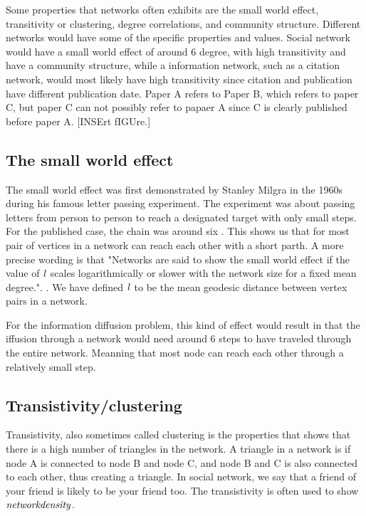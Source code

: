 Some properties that networks often exhibits are the small world effect, transitivity or clustering, degree correlations, and community structure\cite{ComplexNetwork2003}. Different networks would have some of the specific properties and values. Social network would have a small world effect of around 6 degree, with high transitivity and have a community structure, while a information network, such as a citation network, would most likely have high transitivity since citation and publication have different publication date. Paper A refers to Paper B, which refers to paper C, but paper C can not possibly refer to papaer A since C is clearly published before paper A. [INSErt fIGUre.]

\subsection{The small world effect}
The small world effect was first demonstrated by Stanley Milgra in the 1960s during his famous letter passing experiment\cite{SmallWorldProblemSmilgram1960}. The experiment was about passing letters from person to person to reach a designated target with only small steps. For the published case, the chain was around six \cite{Experiment1969}. This shows us that for most pair of vertices in a network can reach each other with a short parth. A more precise wording is that "Networks are said to show the small world effect if the value of $\it{l}$ scales logarithmically or slower with the network size for a fixed mean degree.". \cite{ComplexNetwork2003}. We have defined $\it{l} $ to be the mean geodesic distance between vertex pairs in a network.

For the information diffusion problem, this kind of effect would result in that the  iffusion through a network would need around 6 steps to have traveled through the entire network. Meanning that most node can reach each other through a relatively small step.

\subsection{Transistivity/clustering}
Transistivity, also sometimes called clustering is the properties that shows that there is a high number of triangles in the network. A triangle in a network is if node A is connected to node B and node C, and node B and C is also connected to each other, thus creating a triangle. In social network, we say that a friend of your friend is likely to be your friend too\cite{ComplexNetwork2003}. The transistivity is often used to show $\it{network density}$.

